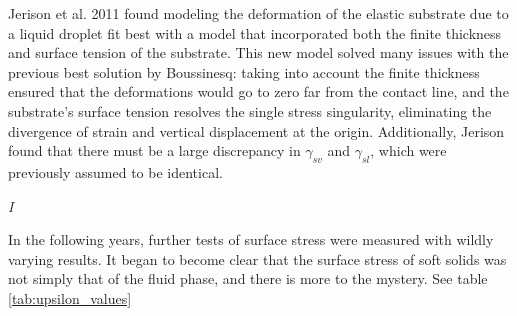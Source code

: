 Jerison et al. 2011 \cite{jerison2011deformation} found modeling the deformation of the elastic substrate due to a liquid droplet fit best with a model that incorporated both the finite thickness and surface tension of the substrate. This new model solved many issues with the previous best solution by Boussinesq: taking into account the finite thickness ensured that the deformations would go to zero far from the contact line, and the substrate's surface tension resolves the single stress singularity, eliminating the divergence of strain and vertical displacement at the origin. Additionally, Jerison found that there must be a large discrepancy in $\gamma_{sv}$ and $\gamma_{sl}$, which were previously assumed to be identical.

\emph{I}

In the following years, further tests of surface stress were measured with wildly varying results. It began to become clear that the surface stress of soft solids was not simply that of the fluid phase, and there is more to the mystery. See table \ref{tab:upsilon_values}
